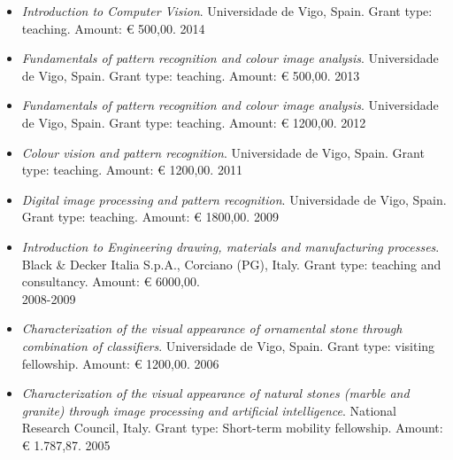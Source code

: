\documentclass[11pt]{article}
\begin{document}
\begin{itemize}
	\item \emph{Introduction to Computer Vision}. Universidade de Vigo, Spain. Grant type: teaching. Amount: € 500,00. \hfill 2014
\end{itemize}

\begin{itemize}
	\item \emph{Fundamentals of pattern recognition and colour image analysis}. Universidade de Vigo, Spain. Grant type: teaching. Amount: € 500,00. \hfill 2013
\end{itemize}

\begin{itemize}
	\item \emph{Fundamentals of pattern recognition and colour image analysis}. Universidade de Vigo, Spain. Grant type: teaching. Amount: € 1200,00. \hfill 2012
\end{itemize}

\begin{itemize}
	\item \emph{Colour vision and pattern recognition}. Universidade de Vigo, Spain. Grant type: teaching. Amount: € 1200,00. \hfill 2011
\end{itemize}

\begin{itemize}
	\item \emph{Digital image processing and pattern recognition}. Universidade de Vigo, Spain. Grant type: teaching. Amount: € 1800,00. \hfill 2009
\end{itemize}

\begin{itemize}
	\item \emph{Introduction to Engineering drawing, materials and manufacturing processes}. Black \& Decker Italia S.p.A., Corciano (PG), Italy. Grant type: teaching and consultancy. Amount: € 6000,00. \\ \mbox{} \hfill 2008-2009
\end{itemize}

\begin{itemize}
	\item \emph{Characterization of the visual appearance of ornamental stone through combination of classifiers}. Universidade de Vigo, Spain. Grant type: visiting fellowship. Amount: € 1200,00. \hfill 2006
\end{itemize}

\begin{itemize}
	\item \emph{Characterization of the visual appearance of natural stones (marble and granite) through image processing and artificial intelligence}. National Research Council, Italy. Grant type: Short-term mobility fellowship. Amount: € 1.787,87. \hfill 2005
\end{itemize}
\end{document}

